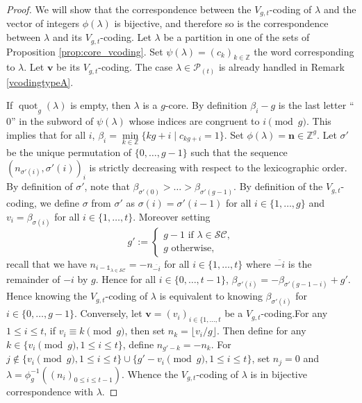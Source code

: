 \documentclass[11pt,letterpaper]{amsart}
\def\bbbz{\mathbb Z}
\def\ccsc{\mathcal {SC}}
\def\ccp{\mathcal P}
\DeclareMathOperator{\quot}{quot}
\numberwithin{equation}{section}
\numberwithin{df}{section}
\begin{document}
\begin{proof}
We will show that the correspondence between the $V_{g,t}$-coding of $\lambda$ and the vector of integers $\phi(\lambda)$ is bijective, and therefore so is the correspondence between $\lambda$ and its $V_{g,t}$-coding.
Let $\lambda$ be a partition in one of the sets of Proposition \ref{prop:core_vcoding}. Set $\psi(\lambda)=\left(c_k\right)_{k\in\bbbz}$ the word corresponding to $\lambda$. Let $\mathbf{v}$ be its $V_{g,t}$-coding. 
The case $\lambda\in\ccp_{(t)}$ is already handled in Remark \ref{vcodingtypeA}.

If $\quot_{g}(\lambda)$ is empty, then $\lambda$ is a $g$-core. By definition $\beta_i-g$ is the last letter ``$0$'' in the subword of $\psi(\lambda)$ whose indices are congruent to $i\pmod{g}$. This implies that for all $i$, $\beta_i=\underset{k\in\bbbz}{\min}\lbrace kg+i\mid c_{kg+i}=1\rbrace$.
 Set $\phi(\lambda)=\mathbf{n}\in\bbbz^g$. Let $\sigma'$ be the unique permutation of $\lbrace 0,\dots,g-1\rbrace$ such that the sequence $(n_{\sigma'(i)},\sigma'(i))_i$ is strictly decreasing with respect to the lexicographic order. By definition of $\sigma'$, note that $\beta_{\sigma'(0)}>\dots>\beta_{\sigma'(g-1)}$. 
By definition of the $V_{g,t}$-coding, we define $\sigma$ from $\sigma'$ as $\sigma(i)=\sigma'(i-1)$ for all $i\in\lbrace 1,\dots,g\rbrace$ and $v_i=\beta_{\sigma(i)}$ for all $i\in\lbrace 1,\dots,t\rbrace$.
Moreover setting
 $$g':=\begin{cases} g-1 \text{ if }\lambda\in\ccsc,\\
g \text{ otherwise,}\end{cases}$$
recall that we have $n_{i-\mathds{1}_{\lambda\in\ccsc}}=-n_{\overline{-i}}$ for all $i\in\lbrace 1,\dots,t\rbrace$ where $\overline{-i}$ is the remainder of $-i$ by $g$. Hence for all $i\in\lbrace 0,\dots, t-1\rbrace$, $\beta_{\sigma'(i)}=-\beta_{\sigma'(g-1-i)}+g'$.
Hence knowing the $V_{g,t}$-coding of $\lambda$ is equivalent to knowing $\beta_{\sigma'(i)}$ for $i\in\lbrace 0,\dots,g-1\rbrace$.
Conversely, let $\mathbf{v}=(v_i)_{i\in\lbrace 1,\dots,t}$ be a $V_{g,t}$-coding.For any $1\leq i\leq t$, if $v_i\equiv k\pmod{g}$, then set $n_k=\lfloor v_i/g\rfloor$. Then define for any $k\in\lbrace v_i\pmod{g},1\leq i\leq t\rbrace$, define $n_{g'-k}=-n_k$. For $j\not\in \lbrace v_i\pmod{g},1\leq i\leq t\rbrace\cup \lbrace g'-v_i\pmod{g},1\leq i\leq t\rbrace$, set $n_j=0$ and $\lambda=\phi_g^{-1}((n_i)_{0\leq i \leq t-1})$.
 Whence the $V_{g,t}$-coding of $\lambda$ is in bijective correspondence with $\lambda$.


\end{proof}
\end{document}
